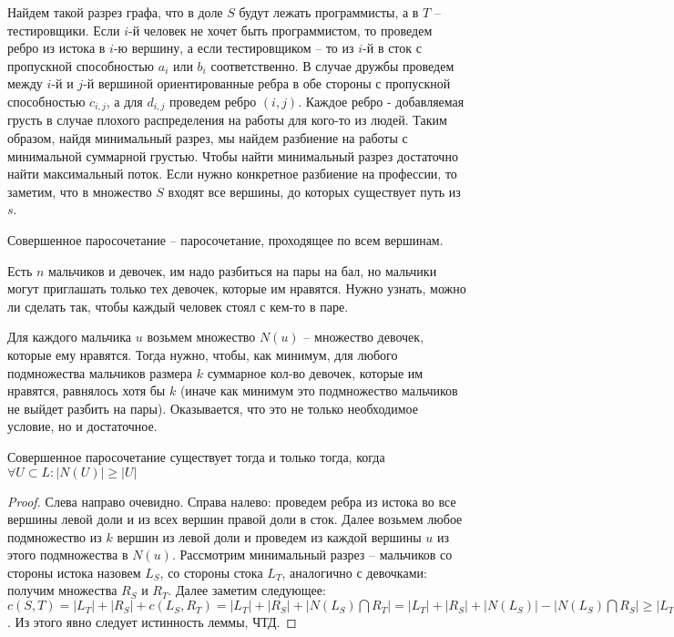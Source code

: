 \begin{solution}
    Найдем такой разрез графа, что в доле $S$ будут лежать программисты, а в $T$ -- тестировщики. Если $i$-й человек не хочет быть программистом, то проведем ребро из истока в $i$-ю вершину, а если тестировщиком -- то из $i$-й в сток с пропускной способностью $a_i$ или $b_i$ соответственно. В случае дружбы проведем между $i$-й и $j$-й вершиной ориентированные ребра в обе стороны с пропускной способностью $c_{i, j}$, а для $d_{i, j}$ проведем ребро $(i, j)$. Каждое ребро - добавляемая грусть в случае плохого распределения на работы для кого-то из людей. Таким образом, найдя минимальный разрез, мы найдем разбиение на работы с минимальной суммарной грустью. Чтобы найти минимальный разрез достаточно найти максимальный поток. Если нужно конкретное разбиение на профессии, то заметим, что в множество $S$ входят все вершины, до которых существует путь из $s$.
\end{solution}

\begin{definition}
    Совершенное паросочетание -- паросочетание, проходящее по всем вершинам.
\end{definition}

\begin{problem}
    Есть $n$ мальчиков и девочек, им надо разбиться на пары на бал, но мальчики могут приглашать только тех девочек, которые им нравятся. Нужно узнать, можно ли сделать так, чтобы каждый человек стоял с кем-то в паре.
\end{problem}
\begin{solution}
    Для каждого мальчика $u$ возьмем множество $N(u)$ -- множество девочек, которые ему нравятся. Тогда нужно, чтобы, как минимум, для любого подмножества мальчиков размера $k$ суммарное кол-во девочек, которые им нравятся, равнялось хотя бы $k$ (иначе как минимум это подмножество мальчиков не выйдет разбить на пары). Оказывается, что это не только необходимое условие, но и достаточное.
\end{solution}

\begin{lemma}[Холла]
    Совершенное паросочетание существует тогда и только тогда, когда $\forall U \subset L: |N(U)| \geq |U|$
\end{lemma}
\begin{proof}
    Слева направо очевидно. Справа налево: проведем ребра из истока во все вершины левой доли и из всех вершин правой доли в сток. Далее возьмем любое подмножество из $k$ вершин из левой доли и проведем из каждой вершины $u$ из этого подмножества в $N(u)$. Рассмотрим минимальный разрез -- мальчиков со стороны истока назовем $L_S$, со стороны стока $L_T$, аналогично с девочками: получим множества $R_S$ и $R_T$. Далее заметим следующее: $c(S, T) = |L_T| + |R_S| + c(L_S, R_T) = |L_T| + |R_S| + |N(L_S) \bigcap R_T| = |L_T| + |R_S| + |N(L_S)| - |N(L_S) \bigcap R_S| \geq |L_T| + |N(L_S)| \geq |L_T| + |L_S| = |L|$. Из этого явно следует истинность леммы, ЧТД.
\end{proof}






